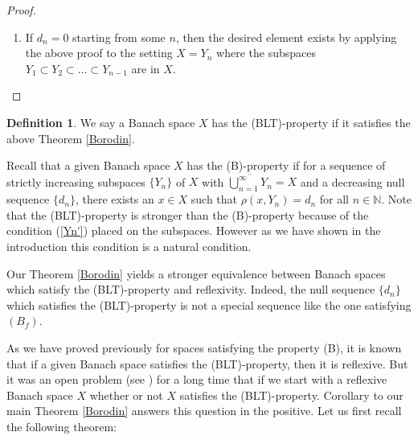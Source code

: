 \documentclass[12pt, reqno]{amsart}
\theoremstyle{definition}
\newtheorem{definition}[theorem]{Definition}
\theoremstyle{remark}
\numberwithin{equation}{section}
\begin{document}
\begin{proof}
\begin{enumerate}
\begin{itemize}
$$
d_{2}=\rho(x,Y_{2})=\rho((x-\lambda z)+\lambda z,Y_2)=\rho(\lambda z,Y_{2})=\lambda d_{2};
$$
therefore, $\lambda=1$ and
$$\rho(x,Y_n)=\rho(z,Y_n)=d_n~\mbox{ for all $n\ge 2$}.
$$
This together with the fact that $\rho(x,Y_1)=d_1$ entails $\rho(x,Y_n)=d_n$ for all $n\ge1$.
\item If $d_1=d_2$, then it suffices to take
$$
q_{1,n}=z_1
$$
with $z_1\in Y_2\backslash Y_1$ satisfying $\|z_1\|=1$. The constructions of
$$q_{2,n},~q_{3,n},\ldots$$ are similar to the above proof.
\end{itemize}
\item If $d_n=0$ starting from some $n$, then the desired element exists by applying the above proof to the setting $X=Y_n$  where the subspaces $Y_1\subset Y_2\subset\ldots\subset Y_{n-1}$  are in $X$.
\end{enumerate}
\end{proof}
\begin{definition}
\label{def:BLT}
We say a Banach space  $X$ has  the (BLT)-property if it satisfies the above Theorem \ref{Borodin}.
\end{definition}
Recall that a given Banach space  $X$ has the (B)-property if for a sequence of strictly increasing subspaces $\{Y_n\}$ of $X$  with  $\overline{\bigcup_{n=1}^{\infty} Y_n}=X$ and a decreasing null sequence $ \{d_n\}$, there exists an $x\in X$ such that $\rho(x, Y_n) =d_n$ for all $n\in \mathbb{N}$.
 Note that the (BLT)-property is stronger than the (B)-property because of the condition  (\ref{Yn'}) placed on the subspaces. However as we have shown in the introduction this condition is a natural condition.  

Our Theorem \ref{Borodin} yields a stronger equivalence between Banach spaces  which satisfy  the  (BLT)-property  and reflexivity. Indeed, the null sequence $\{d_n\}$ which satisfies the (BLT)-property is not a special sequence like the one satisfying $(B_f)$.

 As we have proved previously  for spaces satisfying the property (B), it is known that if a given Banach space satisfies the (BLT)-property, then it is reflexive. But it was an open problem (see \cite[p. 152 ]{Sin}) for a long time that if we start with a reflexive Banach space $X$  whether or not  $X$ satisfies the (BLT)-property.  Corollary to our main Theorem \ref{Borodin} answers this question in the positive. Let us first recall the following theorem:
\end{document}
